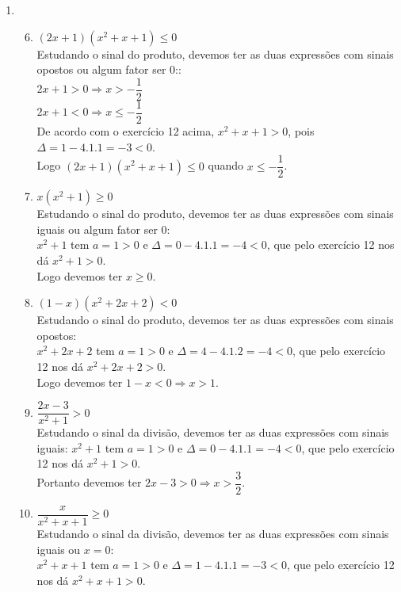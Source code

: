 \begin{enumerate}
\begin{enumerate}
		\end{enumerate}
	\item %
	\begin{enumerate}
		\setcounter{enumii}{5}
		\item %
		$(2x + 1)(x^2+x+1) \leq 0$\\
			Estudando o sinal do produto, devemos ter as duas expressões com sinais opostos ou algum fator ser 0::\\
			$2x + 1 > 0 \Rightarrow x > -\dfrac{1}{2}$\\
			$2x + 1 < 0 \Rightarrow x \leq -\dfrac{1}{2}$\\
			De acordo com o exercício 12 acima, $x^2+x+1 >0$, pois $\Delta = 1 - 4.1.1 = -3 < 0$.\\ 
			Logo $(2x + 1)(x^2+x+1) \leq 0$ quando $x \leq -\dfrac{1}{2}$.
		\item %
		$x(x^2+1)\geq 0$\\
		Estudando o sinal do produto, devemos ter as duas expressões com sinais iguais ou algum fator ser 0:\\
		$x^2+1$ tem $a = 1 > 0$ e $\Delta = 0 - 4.1.1=-4<0$, que pelo exercício 12 nos dá $x^2+1 > 0$.\\
		Logo devemos ter $x \geq 0$.
		\item %
		$(1-x)(x^2+2x+2)<0$\\
		Estudando o sinal do produto, devemos ter as duas expressões com sinais opostos:\\
		$x^2+2x+2$ tem $a=1 >0$ e $\Delta = 4-4.1.2=-4 <0$, que pelo exercício 12 nos dá $x^2+2x+2 > 0$.\\
		Logo devemos ter $1-x < 0 \Rightarrow x > 1$.
		\item %
		$\dfrac{2x-3}{x^2+1}>0$\\		
		Estudando o sinal da divisão, devemos ter as duas expressões com sinais iguais:
		$x^2+1$ tem $a = 1 > 0$ e $\Delta = 0 - 4.1.1 = -4 < 0$, que pelo exercício 12 nos dá $x^2+1 > 0$.\\
		Portanto devemos ter $2x - 3 > 0 \Rightarrow x > \dfrac{3}{2}$.
		\item %
		$\dfrac{x}{x^2+x+1}\geq 0$\\
		Estudando o sinal da divisão, devemos ter as duas expressões com sinais iguais ou $x = 0$:\\
		$x^2+x+1$ tem $a=1 > 0$ e $\Delta = 1-4.1.1 = -3 < 0$, que pelo exercício 12 nos dá $x^2+x+1 > 0$.\\

\end{enumerate}
\end{enumerate}
